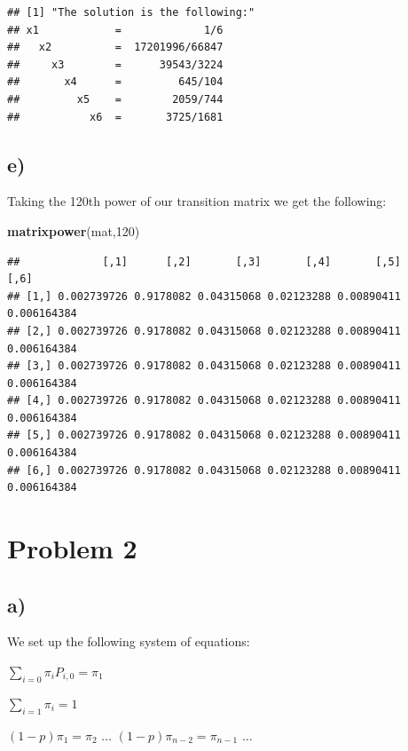 \documentclass[]{article}
\newenvironment{Shaded}{\begin{snugshade}}{\end{snugshade}}
\newcommand{\DecValTok}[1]{\textcolor[rgb]{0.00,0.00,0.81}{#1}}
\newcommand{\KeywordTok}[1]{\textcolor[rgb]{0.13,0.29,0.53}{\textbf{#1}}}
\newcommand{\NormalTok}[1]{#1}
\begin{document}
\begin{verbatim}
## [1] "The solution is the following:"
## x1            =             1/6 
##   x2          =  17201996/66847 
##     x3        =      39543/3224 
##       x4      =         645/104 
##         x5    =        2059/744 
##           x6  =       3725/1681
\end{verbatim}

\hypertarget{e}{%
\subsection{e)}\label{e}}

Taking the 120th power of our transition matrix we get the following:

\begin{Shaded}
\begin{Highlighting}[]
\KeywordTok{matrixpower}\NormalTok{(mat,}\DecValTok{120}\NormalTok{)}
\end{Highlighting}
\end{Shaded}

\begin{verbatim}
##             [,1]      [,2]       [,3]       [,4]       [,5]        [,6]
## [1,] 0.002739726 0.9178082 0.04315068 0.02123288 0.00890411 0.006164384
## [2,] 0.002739726 0.9178082 0.04315068 0.02123288 0.00890411 0.006164384
## [3,] 0.002739726 0.9178082 0.04315068 0.02123288 0.00890411 0.006164384
## [4,] 0.002739726 0.9178082 0.04315068 0.02123288 0.00890411 0.006164384
## [5,] 0.002739726 0.9178082 0.04315068 0.02123288 0.00890411 0.006164384
## [6,] 0.002739726 0.9178082 0.04315068 0.02123288 0.00890411 0.006164384
\end{verbatim}

\newpage

\hypertarget{problem-2}{%
\section{Problem 2}\label{problem-2}}

\hypertarget{a-1}{%
\subsection{a)}\label{a-1}}

We set up the following system of equations:

\(\sum_{i=0} \pi_{i} P_{i,0} = \pi_{1}\)

\(\sum_{i=1} \pi_{i} = 1\)

\((1 - p) \pi_{1} = \pi_{2}\) \(\dots\)
\((1 - p) \pi_{n-2} = \pi_{n-1}\) \(\dots\)
\end{document}
